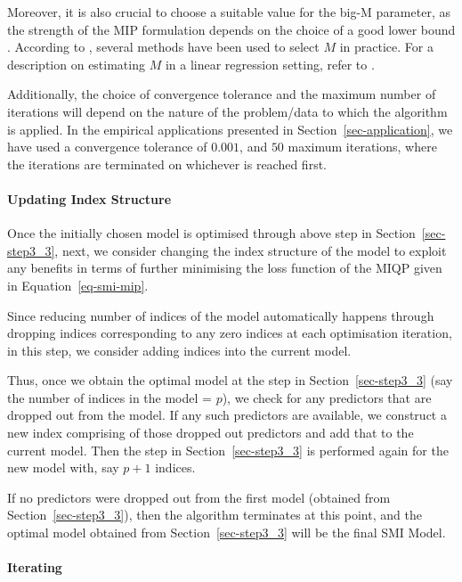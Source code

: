 \documentclass[11pt,a4paper,]{article}
\begin{document}
Moreover, it is also crucial to choose a suitable value for the big-M
parameter, as the strength of the MIP formulation depends on the choice
of a good lower bound \autocite{Bertsimas2016}. According to
\textcite{Hazimeh2023}, several methods have been used to select \(M\)
in practice. For a description on estimating \(M\) in a linear
regression setting, refer to \textcite{Bertsimas2016}.

Additionally, the choice of convergence tolerance and the maximum number
of iterations will depend on the nature of the problem/data to which the
algorithm is applied. In the empirical applications presented in
Section~\ref{sec-application}, we have used a convergence tolerance of
\(0.001\), and \(50\) maximum iterations, where the iterations are
terminated on whichever is reached first.

\hypertarget{sec-step3_4}{%
\paragraph{Updating Index Structure}\label{sec-step3_4}}

Once the initially chosen model is optimised through above step in
Section~\ref{sec-step3_3}, next, we consider changing the index
structure of the model to exploit any benefits in terms of further
minimising the loss function of the MIQP given in
Equation~\ref{eq-smi-mip}.

Since reducing number of indices of the model automatically happens
through dropping indices corresponding to any zero indices at each
optimisation iteration, in this step, we consider adding indices into
the current model.

Thus, once we obtain the optimal model at the step in
Section~\ref{sec-step3_3} (say the number of indices in the model =
\(p\)), we check for any predictors that are dropped out from the model.
If any such predictors are available, we construct a new index
comprising of those dropped out predictors and add that to the current
model. Then the step in Section~\ref{sec-step3_3} is performed again for
the new model with, say \(p+1\) indices.

If no predictors were dropped out from the first model (obtained from
Section~\ref{sec-step3_3}), then the algorithm terminates at this point,
and the optimal model obtained from Section~\ref{sec-step3_3} will be
the final SMI Model.

\hypertarget{sec-step3_5}{%
\paragraph{Iterating}\label{sec-step3_5}}
\end{document}
